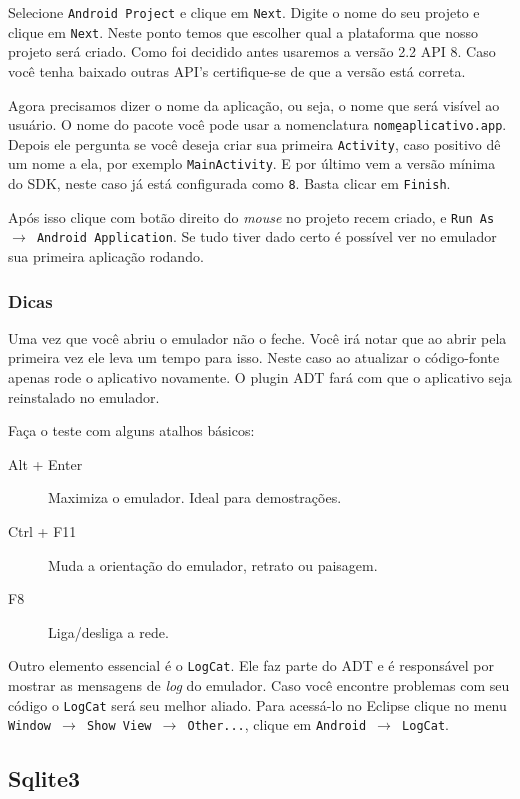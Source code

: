 Selecione \texttt{Android Project} e clique em \texttt{Next}. Digite o nome do seu projeto e clique em
\texttt{Next}. Neste ponto temos que escolher qual a plataforma que nosso projeto será criado. Como foi
decidido antes usaremos a versão 2.2 API 8. Caso você tenha baixado outras API's certifique-se de que
a versão está correta.

Agora precisamos dizer o nome da aplicação, ou seja, o nome que será visível ao usuário. O nome do pacote
você pode usar a nomenclatura \texttt{nome\b{ }aplicativo.app}. Depois ele pergunta se você deseja
criar sua primeira \texttt{Activity}, caso positivo dê um nome a ela, por exemplo \texttt{MainActivity}.
E por último vem a versão mínima do SDK, neste caso já está configurada como \texttt{8}. Basta clicar
em \texttt{Finish}.

Após isso clique com botão direito do \textit{mouse} no projeto recem criado, e \texttt{Run As $\rightarrow$
Android Application}. Se tudo tiver dado certo é possível ver no emulador sua primeira aplicação
rodando.

\subsubsection{Dicas}

Uma vez que você abriu o emulador não o feche. Você irá notar que ao abrir
pela primeira vez ele leva um tempo para isso. Neste caso ao atualizar o código-fonte apenas
rode o aplicativo novamente. O plugin ADT fará com que o aplicativo seja reinstalado no emulador.

Faça o teste com alguns atalhos básicos:
\begin{description}
	\item[Alt + Enter] Maximiza o emulador. Ideal para demostrações.
	\item[Ctrl + F11] Muda a orientação do emulador, retrato ou paisagem.
	\item[F8] Liga/desliga a rede.
\end{description}

Outro elemento essencial é o \texttt{LogCat}. Ele faz parte do ADT e é responsável por mostrar
as mensagens de \textit{log} do emulador. Caso você encontre problemas com seu código o \texttt{LogCat}
será seu melhor aliado. Para acessá-lo no Eclipse clique no menu \texttt{Window $\rightarrow$ Show View
$\rightarrow$ Other...}, clique em \texttt{Android $\rightarrow$ LogCat}.

\subsection{Sqlite3}

